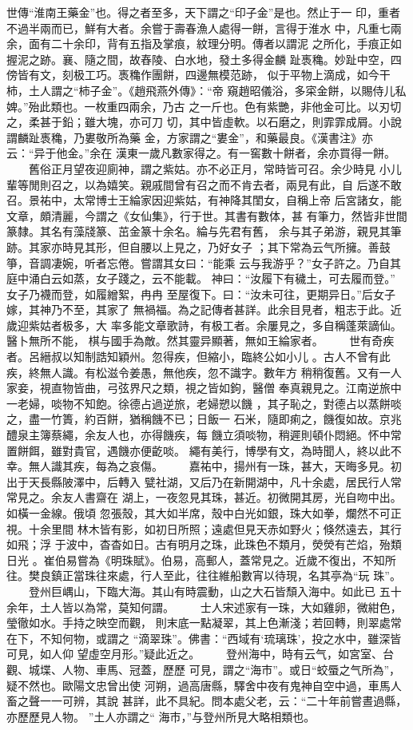 \documentclass{ctexart}
\begin{document}
世傳``淮南王藥金''也。得之者至多，天下謂之``印子金''是也。然止于一 印，重者不過半兩而已，鮮有大者。余嘗于壽春漁人處得一餅，言得于淮水 中，凡重七兩余，面有二十余印，背有五指及掌痕，紋理分明。傳者以謂泥 之所化，手痕正如握泥之跡。襄、隨之間，故舂陵、白水地，發土多得金麟 趾褭穐。妙趾中空，四傍皆有文，刻极工巧。褭穐作團餅，四邊無模范跡， 似于平物上滴成，如今干柿，土人謂之``柿子金''。《趙飛燕外傳》：``帝 窺趙昭儀浴，多寀金餅，以賜侍儿私婢。''殆此類也。一枚重四兩余，乃古 之一斤也。色有紫艷，非他金可比。以刃切之，柔甚于鉛；雖大塊，亦可刀 切，其中皆虛軟。以石磨之，則霏霏成屑。小說謂麟趾褭穐，乃婁敬所為藥 金，方家謂之``婁金''，和藥最良。《漢書注》亦云：``异于他金。''余在 漢東一歲凡數家得之。有一窖數十餅者，余亦買得一餅。 　　舊俗正月望夜迎廁神，謂之紫姑。亦不必正月，常時皆可召。余少時見 小儿輩等閒則召之，以為嬉笑。親戚間曾有召之而不肯去者，兩見有此，自 后遂不敢召。景祐中，太常博士王綸家因迎紫姑，有神降其閨女，自稱上帝 后宮諸女，能文章，頗清麗，今謂之《女仙集》，行于世。其書有數体，甚 有筆力，然皆非世間篆隸。其名有藻牋篆、茁金篆十余名。綸与先君有舊， 余与其子弟游，親見其筆跡。其家亦時見其形，但自腰以上見之，乃好女子 ；其下常為云气所擁。善鼓箏，音調凄婉，听者忘倦。嘗謂其女曰：``能乘 云与我游乎？''女子許之。乃自其庭中涌白云如蒸，女子踐之，云不能載。 神曰：``汝履下有穢土，可去履而登。'' 女子乃襪而登，如履繒絮，冉冉 至屋復下。曰：``汝未可往，更期异日。''后女子嫁，其神乃不至，其家了 無禍福。為之記傳者甚詳。此余目見者，粗志于此。近歲迎紫姑者极多，大 率多能文章歌詩，有极工者。余屢見之，多自稱蓬萊謫仙。醫卜無所不能， 棋与國手為敵。然其靈异顯著，無如王綸家者。 　　世有奇疾者。呂縉叔以知制誥知穎州。忽得疾，但縮小，臨終公如小儿 。古人不曾有此疾，終無人識。有松滋令姜愚，無他疾，忽不識字。數年方 稍稍復舊。又有一人家妾，視直物皆曲，弓弦界尺之類，視之皆如鉤，醫僧 奉真親見之。江南逆旅中一老婦，啖物不知飽。徐德占過逆旅，老婦愬以饑 ，其子恥之，對德占以蒸餅啖之，盡一竹簣，約百餅，猶稱饑不已；日飯一 石米，隨即痢之，饑復如故。京兆醴泉主簿蔡繩，余友人也，亦得饑疾，每 饑立須啖物，稍遲則頓仆悶絕。怀中常置餅餌，雖對貴官，遇饑亦便齕啖。 繩有美行，博學有文，為時聞人，終以此不幸。無人識其疾，每為之哀傷。 　　嘉祐中，揚州有一珠，甚大，天晦多見。初出于天長縣陂澤中，后轉入 甓社湖，又后乃在新開湖中，凡十余處，居民行人常常見之。余友人書齋在 湖上，一夜忽見其珠，甚近。初微開其房，光自吻中出。如橫一金線。俄頃 忽張殼，其大如半席，殼中白光如銀，珠大如拳，爛然不可正視。十余里間 林木皆有影，如初日所照；遠處但見天赤如野火；倏然遠去，其行如飛；浮 于波中，杳杳如日。古有明月之珠，此珠色不類月，熒熒有芒焰，殆類日光 。崔伯易嘗為《明珠賦》。伯易，高郵人，蓋常見之。近歲不復出，不知所 往。樊良鎮正當珠往來處，行人至此，往往維船數宵以待現，名其亭為``玩 珠''。 　　登州巨嵎山，下臨大海。其山有時震動，山之大石皆頹入海中。如此已 五十余年，土人皆以為常，莫知何謂。 　　士人宋述家有一珠，大如雞卵，微紺色，瑩徹如水。手持之映空而觀， 則末底一點凝翠，其上色漸淺；若回轉，則翠處常在下，不知何物，或謂之 ``滴翠珠''。佛書：``西域有`琉璃珠'，投之水中，雖深皆可見，如人仰 望虛空月形。''疑此近之。 　　登州海中，時有云气，如宮室、台觀、城堞、人物、車馬、冠蓋，歷歷 可見，謂之``海市''。或日``蛟蜃之气所為''，疑不然也。歐陽文忠曾出使 河朔，過高唐縣，驛舍中夜有鬼神自空中過，車馬人畜之聲一一可辨，其說 甚詳，此不具紀。問本處父老，云：``二十年前嘗晝過縣，亦歷歷見人物。 ''土人亦謂之`` 海市，''与登州所見大略相類也。 
\end{document}
